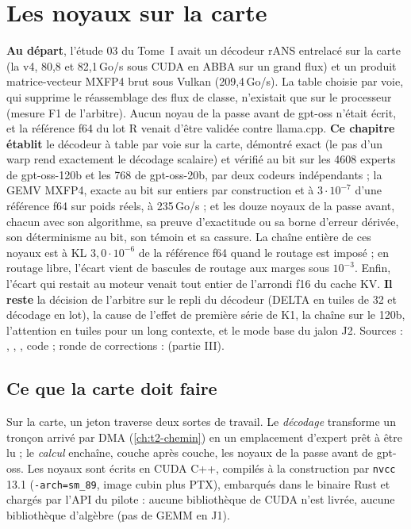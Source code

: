 \chapter{Les noyaux sur la carte}\label{ch:t2-noyaux}
\ifdefined\GrapheNoyDecodeur\else\fi

\begin{origine}
\textbf{Au départ}, l'étude 03 du Tome~I avait un décodeur rANS entrelacé sur la carte (la v4, 80,8 et 82,1\,Go/s sous CUDA en ABBA sur un grand flux) et un produit matrice-vecteur MXFP4 brut sous Vulkan (209,4\,Go/s). La table choisie par voie, qui supprime le réassemblage des flux de classe, n'existait que sur le processeur (mesure F1 de l'arbitre). Aucun noyau de la passe avant de gpt-oss n'était écrit, et la référence f64 du lot R venait d'être validée contre llama.cpp.
\textbf{Ce chapitre établit} le décodeur à table par voie sur la carte, démontré exact (le pas d'un warp rend exactement le décodage scalaire) et vérifié au bit sur les \num{4608} experts de gpt-oss-120b et les 768 de gpt-oss-20b, par deux codeurs indépendants ; la GEMV MXFP4, exacte au bit sur entiers par construction et à $3\cdot10^{-7}$ d'une référence f64 sur poids réels, à 235\,Go/s ; et les douze noyaux de la passe avant, chacun avec son algorithme, sa preuve d'exactitude ou sa borne d'erreur dérivée, son déterminisme au bit, son témoin et sa cassure. La chaîne entière de ces noyaux est à KL $3{,}0\cdot10^{-6}$ de la référence f64 quand le routage est imposé ; en routage libre, l'écart vient de bascules de routage aux marges sous $10^{-3}$. Enfin, l'écart qui restait au moteur venait tout entier de l'arrondi f16 du cache KV.
\textbf{Il reste} la décision de l'arbitre sur le repli du décodeur (DELTA en tuiles de 32 et décodage en lot), la cause de l'effet de première série de K1, la chaîne sur le 120b, l'attention en tuiles pour un long contexte, et le mode base du jalon J2.
Sources : , , , code  ; ronde de corrections :  (partie III).
\end{origine}

\section{Ce que la carte doit faire}\label{sec:t2n-tache}

Sur la carte, un jeton traverse deux sortes de travail. Le \emph{décodage} transforme un tronçon arrivé par DMA (\cref{ch:t2-chemin}) en un emplacement d'expert prêt à être lu ; le \emph{calcul} enchaîne, couche après couche, les noyaux de la passe avant de gpt-oss. Les noyaux sont écrits en CUDA C++, compilés à la construction par \texttt{nvcc} 13.1 (\texttt{-arch=sm\_89}, image cubin plus PTX), embarqués dans le binaire Rust et chargés par l'API du pilote : aucune bibliothèque de CUDA n'est livrée, aucune bibliothèque d'algèbre (pas de GEMM en J1).

